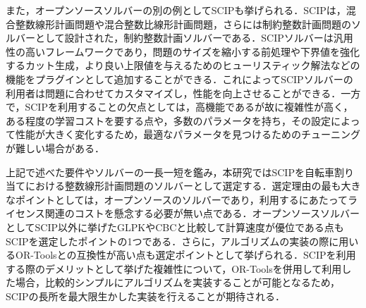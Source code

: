           \par また，オープンソースソルバーの別の例としてSCIPも挙げられる．SCIPは，混合整数線形計画問題や混合整数比線形計画問題，さらには制約整数計画問題のソルバーとして設計された，制約整数計画ソルバーである\cite{bolusani2024scip}．SCIPソルバーは汎用性の高いフレームワークであり，問題のサイズを縮小する前処理や下界値を強化するカット生成，より良い上限値を与えるためのヒューリスティック解法などの機能をプラグインとして追加することができる．これによってSCIPソルバーの利用者は問題に合わせてカスタマイズし，性能を向上させることができる\cite{shinano2013CIPSolver}．一方で，SCIPを利用することの欠点としては，高機能であるが故に複雑性が高く，ある程度の学習コストを要する点や，多数のパラメータを持ち，その設定によって性能が大きく変化するため，最適なパラメータを見つけるためのチューニングが難しい場合がある．
          
          \par 上記で述べた要件やソルバーの一長一短を鑑み，本研究ではSCIPを自転車割り当てにおける整数線形計画問題のソルバーとして選定する．選定理由の最も大きなポイントとしては，オープンソースのソルバーであり，利用するにあたってライセンス関連のコストを懸念する必要が無い点である．オープンソースソルバーとしてSCIP以外に挙げたGLPKやCBCと比較して計算速度が優位である点もSCIPを選定したポイントの1つである．さらに，アルゴリズムの実装の際に用いるOR-Toolsとの互換性が高い点も選定ポイントとして挙げられる．SCIPを利用する際のデメリットとして挙げた複雑性について，OR-Toolsを併用して利用した場合，比較的シンプルにアルゴリズムを実装することが可能となるため，SCIPの長所を最大限生かした実装を行えることが期待される．
          

